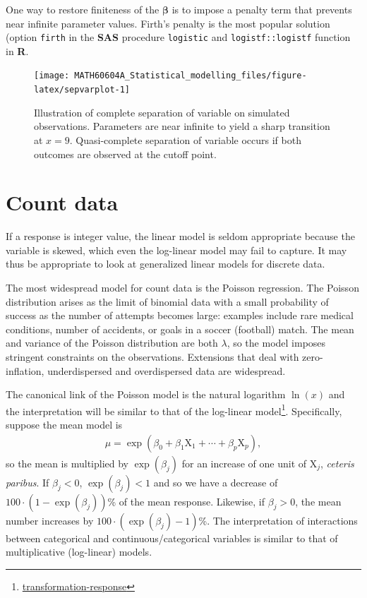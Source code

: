 \documentclass[
  11pt,
  letterpaper,
]{book}
\renewcommand{\href}[2]{#2\footnote{\url{#1}}}
\theoremstyle{definition}
\theoremstyle{definition}
\theoremstyle{definition}
\theoremstyle{definition}
\theoremstyle{remark}
\begin{document}
One way to restore finiteness of the \(\boldsymbol{\beta}\) is to impose a penalty term that prevents near infinite parameter values. Firth's penalty is the most popular solution (option \texttt{firth} in the \textbf{SAS} procedure \texttt{logistic} and \texttt{logistf::logistf} function in \textbf{R}.

\begin{figure}

{\centering \texttt{[image: MATH60604A\_Statistical\_modelling\_files/figure-latex/sepvarplot-1]} 

}

\caption{Illustration of complete separation of variable on simulated observations. Parameters are near infinite to yield a sharp transition at $x=9$. Quasi-complete separation of variable occurs if both outcomes are observed at the cutoff point.}\label{fig:sepvarplot}
\end{figure}

\hypertarget{count-data}{%
\section{Count data}\label{count-data}}

If a response is integer value, the linear model is seldom appropriate because the variable is skewed, which even the log-linear model may fail to capture. It may thus be appropriate to look at generalized linear models for discrete data.

The most widespread model for count data is the Poisson regression. The Poisson distribution arises as the limit of binomial data with a small probability of success as the number of attempts becomes large: examples include rare medical conditions, number of accidents, or goals in a soccer (football) match. The mean and variance of the Poisson distribution are both \(\lambda\), so the model imposes stringent constraints on the observations. Extensions that deal with zero-inflation, underdispersed and overdispersed data are widespread.

The canonical link of the Poisson model is the natural logarithm \(\ln(x)\) and the interpretation will be similar to that of the \href{transformation-response}{log-linear model}. Specifically, suppose the
mean model is
\begin{align*}
\mu = \exp(\beta_0 + \beta_1 \mathrm{X}_{1} + \cdots + \beta_p \mathrm{X}_{p}),
\end{align*}
so the mean is multiplied by \(\exp(\beta_j)\) for an increase of one unit of \(\mathrm{X}_{j}\), \emph{ceteris paribus}. If \(\beta_j < 0\), \(\exp(\beta_j) < 1\) and so we have a decrease of \(100\cdot(1-\exp(\beta_j))\)\% of the mean response. Likewise, if \(\beta_j>0\), the mean number increases by \(100\cdot(\exp(\beta_j)-1)\)\%. The interpretation of interactions between categorical and continuous/categorical variables is similar to that of multiplicative (log-linear) models.
\end{document}
